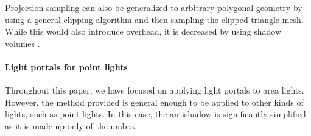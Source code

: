 Projection sampling can also be generalized to arbitrary polygonal geometry by using a general clipping algorithm \cite*[]{greinerEfficientClippingArbitrary1998} and then sampling the clipped triangle mesh. While this would also introduce overhead, it is decreased by using shadow volumes \cite{conduct}.

\paragraph*{Light portals for point lights}
Throughout this paper, we have focused on applying light portals to area lights. However, the method provided is general enough to be applied to other kinds of lights, such as point lights. In this case, the antishadow is significantly simplified as it is made up only of the umbra.

